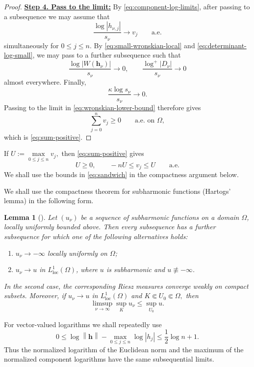 \documentclass[12pt,letterpaper,reqno]{amsart}
\newtheorem{lem}[thm]{Lemma}
\theoremstyle{definition}
\numberwithin{equation}{section}
\newcommand{\loc}{\mathrm{loc}}
\newcommand{\norm}[1]{\left\lVert#1\right\rVert}
\newcommand{\hv}{\bm h}
\begin{document}
\begin{proof}
\medskip\noindent
\textbf{\underline{Step 4. Pass to the limit:}}
By \eqref{eq:component-log-limits}, after passing to a subsequence we
may assume that
\[
 \frac{\log|h_{\nu,j}|}{s_\nu}
 \longrightarrow v_j
 \qquad\text{a.e.}
\]
simultaneously for \(0\leq j\leq n\). By
\eqref{eq:small-wronskian-local} and
\eqref{eq:determinant-log-small}, we may pass to a further subsequence
such that
\[
 \frac{\log|W(\hv_\nu)|}{s_\nu}\longrightarrow0,
 \qquad
 \frac{\log^+|D_\nu|}{s_\nu}\longrightarrow0
\]
almost everywhere. Finally,
\[
\frac{\kappa\log s_\nu}{s_\nu}\longrightarrow0.
\]
Passing to the limit in \eqref{eq:wronskian-lower-bound} therefore gives
\[
 \sum_{j=0}^{n}v_j\geq0
 \qquad\text{a.e.\ on }\Omega,
\]
which is \eqref{eq:sum-positive}.
\end{proof}

If
$
U:=\max\limits_{0\leq j\le n}v_j,
$
then \eqref{eq:sum-positive} gives
\begin{equation}\label{eq:sandwich}
 U\ge0,\qquad
 -nU\leq v_j\leq U
 \qquad\text{a.e.}
\end{equation}
We shall use the bounds in \eqref{eq:sandwich} in the compactness
argument below.

We shall use the compactness theorem for subharmonic functions (Hartogs' lemma) in the following form.

\begin{lem}[{\cite[Theorem~4.1.9(a),(b)]{Hor03}}]\label{lem:subharmonic-compactness}
Let \((u_\nu)\) be a sequence of subharmonic functions on a domain
\(\Omega\), locally uniformly bounded above. Then every subsequence has a
further subsequence for which one of the following alternatives holds:
\begin{enumerate}[label=\textup{(\roman*)}]
\item \(u_\nu\to-\infty\) locally uniformly on \(\Omega\);
\item \(u_\nu\to u\) in \(L^1_{\loc}(\Omega)\), where \(u\) is subharmonic
and \(u\not\equiv-\infty\).
\end{enumerate}
In the second case, the corresponding Riesz measures converge weakly on
compact subsets. Moreover, if \(u_\nu\to u\) in \(L^1_{\loc}(\Omega)\) and
$
 K\Subset U_0\Subset\Omega,
$
then
\[
\limsup_{\nu\to\infty}\sup_Ku_\nu
 \leq\sup_{U_0}u.
\]
\end{lem}

For vector-valued logarithms we shall repeatedly use
\[
0\leq
 \log\norm{\hv}
 -\max_{0\leq j\le n}\log|h_j|
 \leq\frac12\log {n+1}.
\]
Thus the normalized logarithm of the Euclidean norm and the maximum of the
normalized component logarithms have the same subsequential limits.
\end{document}
